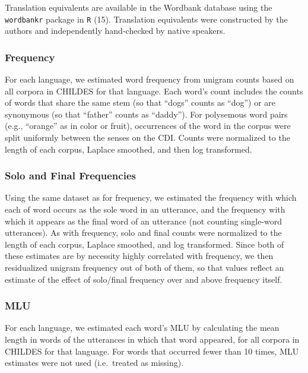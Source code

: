 \documentclass[english,man]{apa6}
\newcounter{author}
\theoremstyle{definition}
\theoremstyle{definition}
\theoremstyle{definition}
\theoremstyle{remark}
\begin{document}
Translation equivalents are available in the Wordbank database using the
\texttt{wordbankr} package in \texttt{R} (15). Translation equivalents
were constructed by the authors and independently hand-checked by native
speakers.

\subsubsection{Frequency}\label{frequency}

For each language, we estimated word frequency from unigram counts based
on all corpora in CHILDES for that language. Each word's count includes
the counts of words that share the same stem (so that \enquote{dogs}
counts as \enquote{dog}) or are synonymous (so that \enquote{father}
counts as \enquote{daddy}). For polysemous word pairs (e.g.,
\enquote{orange} as in color or fruit), occurrences of the word in the
corpus were split uniformly between the senses on the CDI. Counts were
normalized to the length of each corpus, Laplace smoothed, and then log
transformed.

\subsubsection{Solo and Final
Frequencies}\label{solo-and-final-frequencies}

Using the same dataset as for frequency, we estimated the frequency with
which each of word occurs as the sole word in an utterance, and the
frequency with which it appears as the final word of an utterance (not
counting single-word utterances). As with frequency, solo and final
counts were normalized to the length of each corpus, Laplace smoothed,
and log transformed. Since both of these estimates are by necessity
highly correlated with frequency, we then residualized unigram frequency
out of both of them, so that values reflect an estimate of the effect of
solo/final frequency over and above frequency itself.

\subsubsection{MLU}\label{mlu}

For each language, we estimated each word's MLU by calculating the mean
length in words of the utterances in which that word appeared, for all
corpora in CHILDES for that language. For words that occurred fewer than
10 times, MLU estimates were not used (i.e.~treated as missing).
\end{document}
